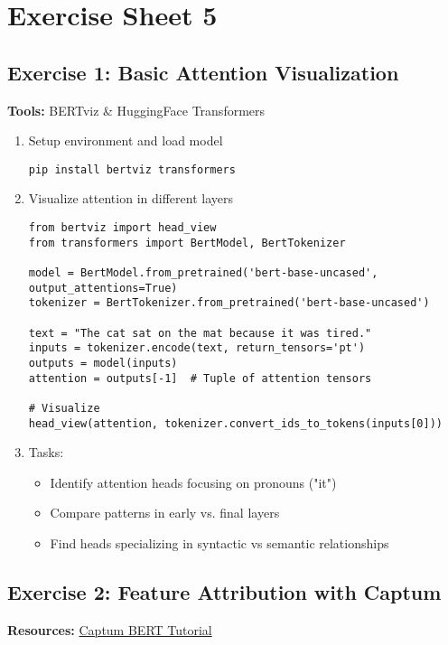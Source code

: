\chapter*{Exercise Sheet 5}
\section*{Exercise 1: Basic Attention Visualization}
\textbf{Tools:} BERTviz \& HuggingFace Transformers

\begin{enumerate}
\item Setup environment and load model
\begin{verbatim}
pip install bertviz transformers
\end{verbatim}

\item Visualize attention in different layers
\begin{verbatim}
from bertviz import head_view
from transformers import BertModel, BertTokenizer

model = BertModel.from_pretrained('bert-base-uncased', output_attentions=True)
tokenizer = BertTokenizer.from_pretrained('bert-base-uncased')

text = "The cat sat on the mat because it was tired."
inputs = tokenizer.encode(text, return_tensors='pt')
outputs = model(inputs)
attention = outputs[-1]  # Tuple of attention tensors

# Visualize
head_view(attention, tokenizer.convert_ids_to_tokens(inputs[0]))
\end{verbatim}

\item Tasks:
\begin{itemize}
\item Identify attention heads focusing on pronouns ("it")
\item Compare patterns in early vs. final layers
\item Find heads specializing in syntactic vs semantic relationships
\end{itemize}
\end{enumerate}

\section*{Exercise 2: Feature Attribution with Captum }
\textbf{Resources:} \href{https://captum.ai/tutorials/Bert_SQUAD_Interpret}{Captum BERT Tutorial}

